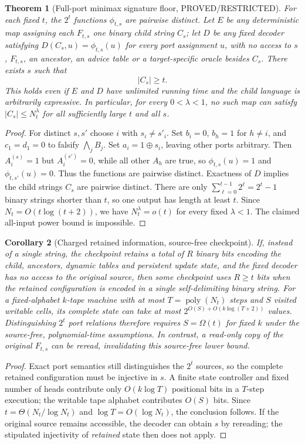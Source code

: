 \documentclass[11pt]{article}
\newtheorem{theorem}{Theorem}
\newtheorem{corollary}[theorem]{Corollary}
\newcommand{\poly}{\operatorname{poly}}
\begin{document}
\begin{theorem}[Full-port minimax signature floor, PROVED/RESTRICTED]\label{th:floor}
For each fixed $t$, the $2^t$ functions $\phi_{t,s}$ are pairwise distinct. Let $E$ be \emph{any} deterministic map assigning each $F_{t,s}$ one binary child string $C_s$; let $D$ be any fixed decoder satisfying $D(C_s,u)=\phi_{t,s}(u)$ for every port assignment $u$, with no access to $s$, $F_{t,s}$, an ancestor, an advice table or a target-specific oracle besides $C_s$. There exists $s$ such that
\[\boxed{|C_s|\ge t.}\]
This holds even if $E$ and $D$ have unlimited running time and the child language is arbitrarily expressive. In particular, for every $0<\lambda<1$, no such map can satisfy $|C_s|\le N_t^\lambda$ for \emph{all} sufficiently large $t$ and all $s$.
\end{theorem}
\begin{proof}
For distinct $s,s'$ choose $i$ with $s_i\ne s'_i$. Set $b_i=0$, $b_h=1$ for $h\ne i$, and $c_1=d_1=0$ to falsify $\bigwedge_jB_j$. Set $a_i=1\oplus s_i$, leaving other ports arbitrary. Then $A_i^{(s)}=1$ but $A_i^{(s')}=0$, while all other $A_h$ are true, so $\phi_{t,s}(u)=1$ and $\phi_{t,s'}(u)=0$. Thus the functions are pairwise distinct. Exactness of $D$ implies the child strings $C_s$ are pairwise distinct. There are only $\sum_{\ell=0}^{t-1}2^\ell=2^t-1$ binary strings shorter than $t$, so one output has length at least $t$. Since $N_t=O(t\log(t+2))$, we have $N_t^\lambda=o(t)$ for every fixed $\lambda<1$. The claimed all-input power bound is impossible.
\end{proof}

\begin{corollary}[Charged retained information, source-free checkpoint]
If, instead of a single string, the checkpoint retains a total of $R$ binary bits encoding the child, ancestors, dynamic tables and persistent update state, and the fixed decoder has no access to the original source, then some checkpoint uses $R\ge t$ bits when the retained configuration is encoded in a single self-delimiting binary string. For a fixed-alphabet $k$-tape machine with at most $T=\poly(N_t)$ steps and $S$ visited writable cells, its complete state can take at most $2^{O(S)+O(k\log(T+2))}$ values. Distinguishing $2^t$ port relations therefore requires $S=\Omega(t)$ for fixed $k$ under the source-free, polynomial-time assumptions. In contrast, a read-only copy of the original $F_{t,s}$ can be reread, invalidating this source-free lower bound.
\end{corollary}
\begin{proof}
Exact port semantics still distinguishes the $2^t$ sources, so the complete retained configuration must be injective in $s$. A finite state controller and fixed number of heads contribute only $O(k\log T)$ positional bits in a $T$-step execution; the writable tape alphabet contributes $O(S)$ bits. Since $t=\Theta(N_t/\log N_t)$ and $\log T=O(\log N_t)$, the conclusion follows. If the original source remains accessible, the decoder can obtain $s$ by rereading; the stipulated injectivity of \emph{retained} state then does not apply.
\end{proof}
\end{document}
